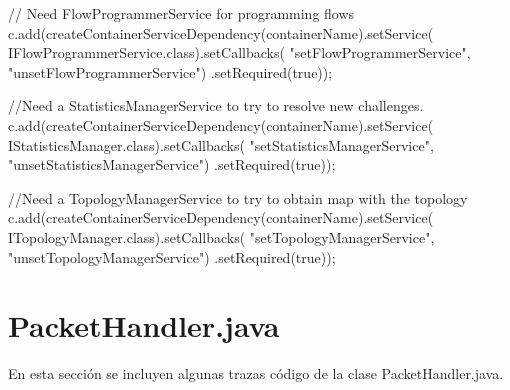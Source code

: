 \documentclass[a4paper,11pt]{book}
\begin{document}
\begin{java}
{{{            // Need FlowProgrammerService for programming flows
            c.add(createContainerServiceDependency(containerName).setService(
                    IFlowProgrammerService.class).setCallbacks(
                    "setFlowProgrammerService", "unsetFlowProgrammerService")
                    .setRequired(true));

            //Need a StatisticsManagerService to try to resolve new challenges.
            c.add(createContainerServiceDependency(containerName).setService(
                    IStatisticsManager.class).setCallbacks(
                    "setStatisticsManagerService", "unsetStatisticsManagerService")
                    .setRequired(true));

            //Need a TopologyManagerService to try to obtain map with the topology
            c.add(createContainerServiceDependency(containerName).setService(
                    ITopologyManager.class).setCallbacks(
                    "setTopologyManagerService", "unsetTopologyManagerService")
                    .setRequired(true));
        }

    }
}

\end{java}
\newpage
\section{PacketHandler.java}
En esta sección se incluyen algunas trazas código de la clase PacketHandler.java.
\end{document}
